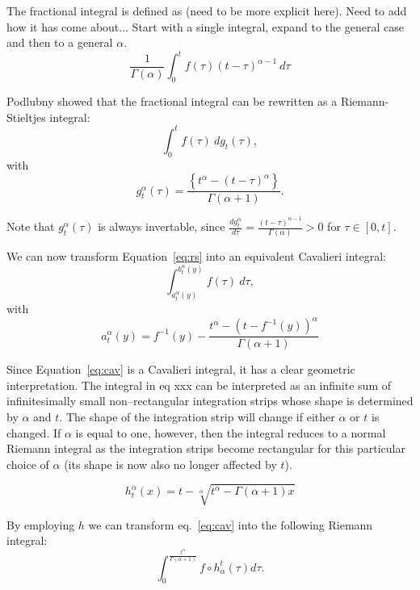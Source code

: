 \documentclass{article}
\theoremstyle{theorem}
\theoremstyle{definition}
\begin{document}
The fractional integral is defined as (need to be more explicit here). Need to add how it has come about... Start with a single integral, expand to the general case and then 
to a general $\alpha$. 
\begin{equation}
\frac{1}{\Gamma(\alpha)}\int_{0}^{t}f(\tau)(t-\tau)^{\alpha-1}~d\tau
\end{equation}

Podlubny showed that the fractional integral can be rewritten as a Riemann-Stieltjes integral:
\begin{equation}
\label{eq:rs}
\int_0^{t} f(\tau)~dg_t(\tau),
\end{equation}
with 
\begin{equation}
g_t^{\alpha}(\tau) = \frac{\left \{t^{\alpha} - (t-\tau)^{\alpha} \right \}}{\Gamma(\alpha+1)}. 
\end{equation}

Note that $g_t^{\alpha}(\tau)$ is always invertable, since $\frac{d g_t^{\alpha}}{d \tau} = \frac{(t-\tau)^{\alpha-1}}{\Gamma(\alpha)}>0$ for $\tau\in[0,t]$. 

We can now transform Equation~\ref{eq:rs} into an equivalent Cavalieri integral:
\begin{equation}
\label{eq:cav}
\int_{a_t^{\alpha}(y)}^{b_t^{\alpha}(y)} f(\tau)~d\tau, 
\end{equation}
with
\begin{equation}
a_t^{\alpha}(y) = f^{-1}(y) - \frac{t^{\alpha}-(t-f^{-1}(y))^{\alpha}}{\Gamma(\alpha+1)}
\end{equation}

Since Equation~\ref{eq:cav} is a Cavalieri integral, it has a clear geometric interpretation. The integral in eq xxx can be interpreted as an infinite
sum of infinitesimally small non–rectangular integration strips whose shape is determined by $\alpha$ and $t$. The shape of the integration 
strip will change if either $\alpha$ or $t$ is changed. If $\alpha$ is equal to one, however, then the integral 
reduces to a normal Riemann integral as the integration strips become rectangular for this particular choice of $\alpha$ (its shape is now also no longer affected by $t$).

\begin{equation}
h_t^{\alpha}(x) = t - \sqrt[\alpha]{t^{\alpha} - \Gamma(\alpha+1)x}
\end{equation}

By employing $h$ we can transform eq.~\ref{eq:cav} into the following Riemann integral:
\begin{equation}
\int_0^{\frac{t^{\alpha}}{\Gamma(\alpha+1)}} f\circ h_{\alpha}^t (\tau) d\tau.  
\end{equation}
\end{document}
